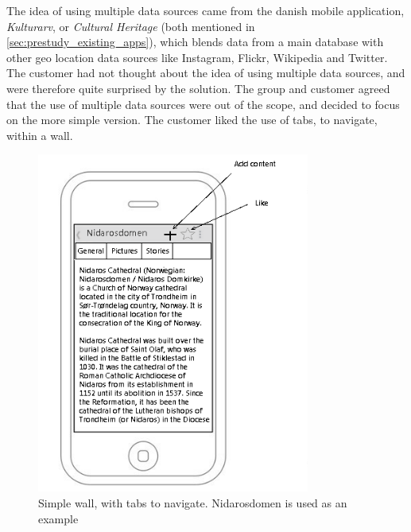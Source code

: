 \documentclass[11pt]{book}
\begin{document}
The idea of using multiple data sources came from the danish mobile application, \emph{Kulturarv}, or \emph{Cultural Heritage} (both mentioned in \ref{sec:prestudy_existing_apps}), which blends data from a main database with other geo location data sources like Instagram, Flickr, Wikipedia and Twitter. The customer had not thought about the idea of using multiple data sources, and were therefore quite surprised by the solution. The group and customer agreed that the use of multiple data sources were out of the scope, and decided to focus on the more simple version. The customer liked the use of tabs, to navigate, within a wall.

\begin{figure}[H]
    \centering
    \includegraphics[width=0.8\textwidth]{Figures/Phases/Sprint1/versiononeSimpleWall.png}
    \caption{Simple wall, with tabs to navigate. Nidarosdomen is used as an example}
    \label{fig:phases_sprint1_uiVersionOneSimpleWall}
\end{figure}
\end{document}
